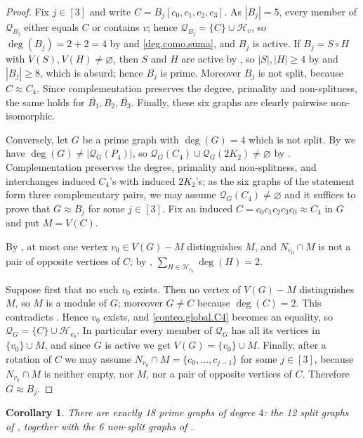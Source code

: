 \documentclass[11pt]{article}
\newtheorem{corollary}[corollary]{Corollary}
\begin{document}
\begin{proof}
		Fix $j\in[3]$ and write $C=B_j[c_0,c_1,c_2,c_3]$. As $|B_j|=5$, every
	member of $\mathcal{Q}_{B_j}$ either equals $C$ or contains $v$; hence
	$\mathcal{Q}_{B_j}=\{C\}\cup\mathcal{H}_v$, so $\deg(B_j)=2+2=4$ by
	 and \eqref{deg.como.suma}, and $B_j$ is active.
	If $B_j=S\circ H$ with $V(S),V(H)\neq\varnothing$, then $S$ and $H$
	are active by , so $|S|,|H|\geq 4$ by
	 and $|B_j|\geq 8$, which is absurd; hence $B_j$ is prime.
	Moreover $B_j$ is not split, because $C\approx C_4$. Since
	complementation preserves the degree, primality and non-splitness,
	the same holds for $\overline{B_1},\overline{B_2},\overline{B_3}$.
	Finally, these six graphs are clearly pairwise non-isomorphic.
	
	Conversely, let $G$ be a prime graph with $\deg(G)=4$ which is not
	split. By  we have
	$\deg(G)\neq|\mathcal{Q}_G(P_4)|$, so $\mathcal{Q}_G(C_4)\cup \mathcal{Q}_G(2K_2)\neq\varnothing$ by
	. Complementation preserves the degree, primality and
	non-splitness, and interchanges induced $C_4$'s with induced
	$2K_2$'s; as the six graphs of the statement form three complementary
	pairs, we may assume $\mathcal{Q}_G(C_4)\neq\varnothing$ and it suffices to
	prove that $G\approx B_j$ for some $j\in[3]$. Fix an induced $C=c_0c_1c_2c_3c_0\approx C_4$ in
	$G$ and put $M=V(C)$.
	
		By , at most one vertex $v_0\in V(G)-M$
	distinguishes $M$, and $N_{v_0}\cap M$ is not a pair of opposite
	vertices of $C$; by ,
	$\sum_{H\in\mathcal{H}_{v_0}}\deg(H)=2$.
	
	Suppose first that no such $v_0$ exists. Then no vertex of $V(G)-M$
	distinguishes $M$, so $M$ is a module of $G$; moreover $G\neq C$
	because $\deg(C)=2$. This contradicts . Hence $v_0$ exists, and \eqref{conteo.global.C4} becomes an equality,
	so $\mathcal{Q}_G=\{C\}\cup\mathcal{H}_{v_0}$. In particular every member
	of $\mathcal{Q}_G$ has all its vertices in $\{v_0\}\cup M$, and since $G$
	is active we get $V(G)=\{v_0\}\cup M$. Finally, after a rotation of
	$C$ we may assume $N_{v_0}\cap M=\{c_0,\dots,c_{j-1}\}$ for some
	$j\in[3]$, because $N_{v_0}\cap M$ is neither empty, nor $M$, nor a
	pair of opposite vertices of $C$. Therefore $G\approx B_j$.
\end{proof}

\begin{corollary}
	\label{clasificacion.primos.deg=4}
	There are exactly 18 prime graphs of degree $4$: the 12
	split graphs of
	,
	together with the 6 non-split graphs of .
\end{corollary}
\end{document}
